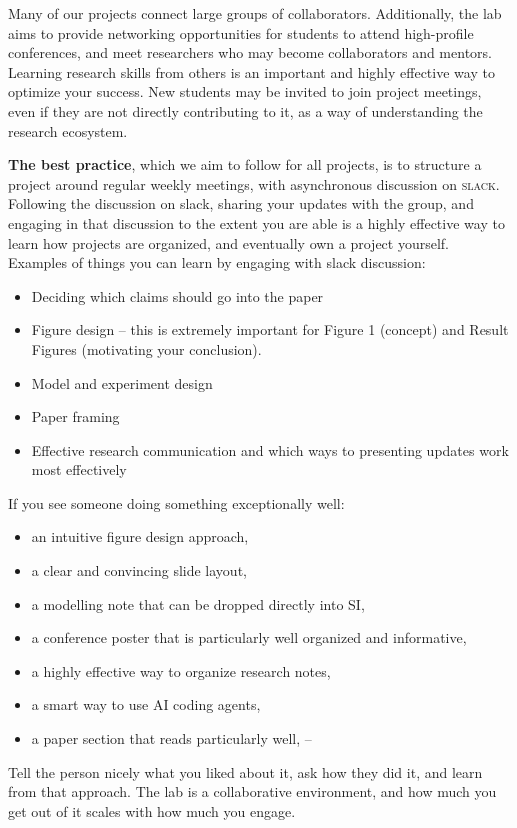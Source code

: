 \documentclass[11pt, letterpaper]{article}
\begin{document}
Many of our projects connect large groups of collaborators. Additionally, the lab aims to provide networking opportunities for students to attend high-profile conferences, and meet researchers who may become collaborators and mentors. Learning research skills from others is an important and highly effective way to optimize your success. New students may be invited to join project meetings, even if they are not directly contributing to it, as a way of understanding the research ecosystem.

\textbf{The best practice}, which we aim to follow for all projects, is to structure a project around regular weekly meetings, with asynchronous discussion on \textsc{slack}. Following the discussion on slack, sharing your updates with the group, and engaging in that discussion to the extent you are able is a highly effective way to learn how projects are organized, and eventually own a project yourself. Examples of things you can learn by engaging with slack discussion:

\begin{itemize}
    \item Deciding which claims should go into the paper 
    \item Figure design -- this is extremely important for Figure 1 (concept) and Result Figures (motivating your conclusion).
    \item Model and experiment design
    \item Paper framing
    \item Effective research communication and which ways to presenting updates work most effectively
\end{itemize}

If you see someone doing something exceptionally well:

\begin{itemize}[itemsep=0.2em]
  \item an intuitive figure design approach,
  \item a clear and convincing slide layout,
  \item a modelling note that can be dropped directly into SI,
  \item a conference poster that is particularly well organized and informative,
  \item a highly effective way to organize research notes,
  \item a smart way to use AI coding agents,
  \item a paper section that reads particularly well, --
\end{itemize}

Tell the person nicely what you liked about it, ask how they did it, and learn from that approach. The lab is a collaborative environment, and how much you get out of it scales with how much you engage.
\end{document}
